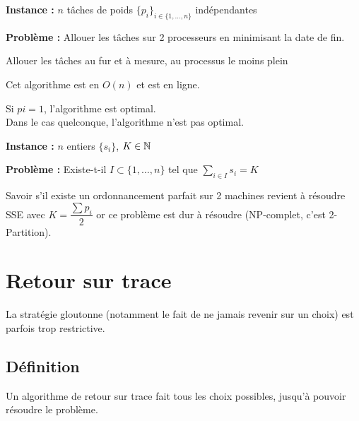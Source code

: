 \begin{definition}[Indep2]\enspace
	
	\textbf{Instance :} $n$ tâches de poids $\{p_i\}_{i \in \{1, \dots, n\}}$ indépendantes
	
	\textbf{Problème :} Allouer les tâches sur 2 processeurs en minimisant la date de fin.
\end{definition}


\begin{algo}
	\label{12-glouton-indep}
	Allouer les tâches au fur et à mesure, au processus le moins plein
\end{algo}

\begin{proposition}
	Cet algorithme est en $O(n)$ et est en ligne.
\end{proposition}

\begin{proposition}
	Si $pi = 1$, l'algorithme est optimal.\\
	Dans le cas quelconque, l'algorithme n'est pas optimal.
\end{proposition}

\begin{definition}\enspace
	
	\textbf{Instance :} $n$ entiers $\{s_i\}$, $K \in \mathbb{N}$
	
	\textbf{Problème :} Existe-t-il $I \subset \{1, \dots, n\}$ tel que $\sum\limits_{i \in I} s_i = K$
\end{definition}

\begin{rem}
	Savoir s'il existe un ordonnancement parfait sur 2 machines revient à résoudre SSE avec $K = \dfrac{\sum p_i}{2}$ or ce problème est dur à résoudre (NP-complet, c'est 2-Partition). 
\end{rem}

\section{Retour sur trace}

La stratégie gloutonne (notamment le fait de ne jamais revenir sur un choix) est parfois trop restrictive.

\subsection{Définition}

\begin{definition}
	Un algorithme de retour sur trace fait tous les choix possibles, jusqu'à pouvoir résoudre le problème.
\end{definition}

